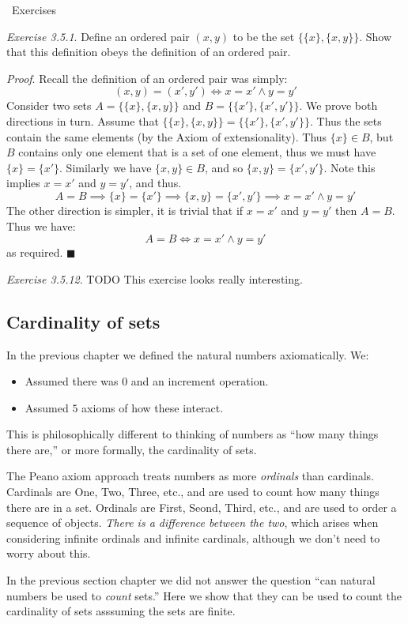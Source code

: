 \documentclass{article}
\newcommand{\exercisesline}{	%
    \begin{center}
    \textemdash\ Exercises\ \textemdash
    \end{center}
}
\let\it\textit
\begin{document}
\exercisesline

\it{Exercise 3.5.1}. Define an ordered pair $(x,y)$ to be the set
$\{\{x\}, \{x,y\}\}$. Show that this definition obeys the definition 
of an ordered pair.

\it{Proof}. Recall the definition of an ordered pair was simply:
$$
(x,y) = (x',y') \iff x=x' \land y=y'
$$
Consider two sets $A = \{ \{x\}, \{x,y\}\}$ and $B = \{ \{x'\}, \{x',y'\}\}$.
We prove both directions in turn. Assume that $\{ \{x\}, \{x,y\}\} = 
\{ \{x'\}, \{x',y'\}\}$. Thus the sets contain the same elements (by the 
Axiom of extensionality). Thus $\{ x\} \in B$, but $B$ contains only one 
element that is a set of one element, thus we must have $\{x\} = \{x'\}$.
Similarly we have $\{x,y\} \in B$, and so $\{x,y\} = \{x',y'\}$. Note
this implies $x = x'$ and $y = y'$, and thus.
$$
A = B \implies \{x\} = \{x'\} \implies  \{x,y\} = \{x',y'\} \implies x=x' \land y=y'
$$
The other direction is simpler, it is trivial that if $x = x'$ and $y = y'$ 
then $A = B$. Thus we have: 
$$
A = B \iff x=x' \land y=y'
$$
as required. \hfill $\blacksquare$

\it{Exercise 3.5.12}. TODO This exercise looks really interesting.

\subsection{Cardinality of sets} In the previous chapter we defined 
the natural numbers axiomatically. We: 
\begin{itemize}
	\item Assumed there was $0$ and an increment operation.
	\item Assumed $5$ axioms of how these interact.
\end{itemize}
This is philosophically different to thinking of numbers as 
``how many things there are,'' or more formally, the cardinality
of sets.

The Peano axiom approach treats numbers as more \it{ordinals}
than cardinals. Cardinals are One, Two, Three, etc., and are 
used to count how many things there are in a set. Ordinals 
are First, Seond, Third, etc., and are used to order a sequence 
of objects. \it{There is a difference between the two}, which 
arises when considering infinite ordinals and infinite cardinals, 
although we don't need to worry about this.

In the previous section chapter we did not answer the question 
``can natural numbers be used to \it{count} sets.'' Here 
we show that they can be used to count the cardinality of sets 
asssuming the sets are finite.
\end{document}
